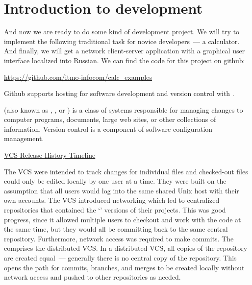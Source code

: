 \section*{Introduction to development} %

And now we are ready to do some kind of development project. We will try
to implement the following traditional task for novice developers~---
a calculator. And finally, we will get a network client-server application
with a graphical user interface localized into Russian. We can find the code
for this project on github:

\href{https://github.com/itmo-infocom/calc\_examples}%
     {https://github.com/itmo-infocom/calc\_examples}

Github supports hosting for software development and version control with .

 (also known as ,
, or ) is a class of
systems responsible for managing changes to computer programs, documents,
large web sites, or other collections of information. Version control is
a component of software configuration management.

\href{https://initialcommit.com/blog/Technical-Guide-VCS-Internals}%
     {VCS Release History Timeline}

The  VCS were intended to track changes for individual
files and checked-out files could only be edited locally by one user at a time.
They were built on the assumption that all users would log into the same shared
Unix host with their own accounts. The  VCS introduced
networking which led to centralized repositories that contained
the `' versions of their projects. This was good progress,
since it allowed multiple users to checkout and work with the code at the same
time, but they would all be committing back to the same central repository.
Furthermore, network access was required to make commits. The 
comprises the distributed VCS. In a distributed VCS, all copies of
the repository are created equal~--- generally there is no central copy of
the repository. This opens the path for commits, branches, and merges to be
created locally without network access and pushed to other repositories
as needed.

